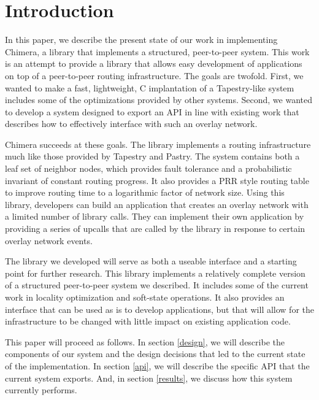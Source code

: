 \section{Introduction}
\label{introduction}

In this paper, we describe the present state of our work in implementing
Chimera, a library that implements a structured, peer-to-peer system.
This work is an attempt to provide a library that allows easy development
of applications on top of a peer-to-peer routing infrastructure. The goals
are twofold. First, we wanted to make a fast, lightweight, C implantation
of a Tapestry-like system includes some of the optimizations provided by
other systems. Second, we wanted to develop a system designed to export
an API in line with existing work that describes how to effectively
interface with such an overlay network.

Chimera succeeds at these goals. The library implements a routing
infrastructure much like those provided by Tapestry and Pastry. The system
contains both a leaf set of neighbor nodes, which provides fault tolerance
and a probabilistic invariant of constant routing progress. It also provides a PRR
style routing table to improve routing time to a logarithmic factor of
network size. Using this library, developers can build an application
that creates an overlay network with a limited number of library calls.
They can implement their own application by providing a series of
upcalls that are called by the library in response to certain overlay
network events.

The library we developed will serve as both a
useable interface and a starting point for further research. This library
implements a relatively complete version of a structured peer-to-peer
system we described. It includes some of the current work in locality
optimization and soft-state operations. It also provides an interface
that can be used as is to develop applications, but that will allow for
the infrastructure to be changed with little impact on existing
application code.

This paper will proceed as follows. In section \ref{design}, we will
describe the components of our system and the design decisions that led
to the current state of the implementation. In section \ref{api},
we will describe the specific API that the current system exports. And,
in section \ref{results}, we discuss how this system currently
performs.

